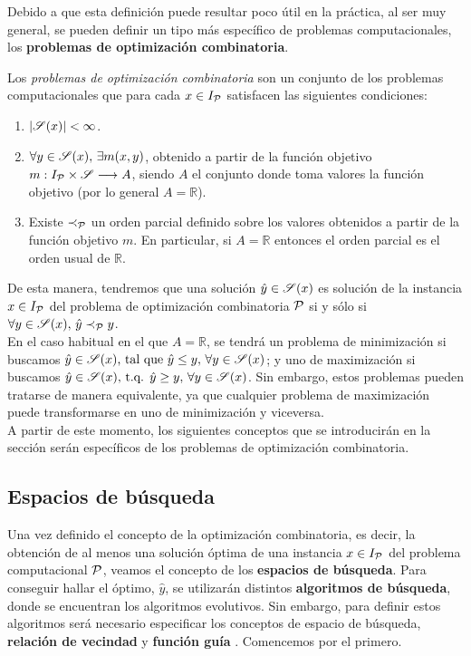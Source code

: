 Debido a que esta definición puede resultar poco útil en la práctica, al ser muy general, se pueden definir un tipo más específico de problemas computacionales, los \textbf{problemas de optimización combinatoria}.

\begin{definition}
    Los \textit{problemas de optimización combinatoria} son un conjunto de los problemas computacionales que para cada $x\in I_{\mathcal{P}}$ satisfacen las siguientes condiciones:
\begin{enumerate}
    \item $|\mathscr{S}(x)|<\infty$.
    \item $\forall y \in \mathscr{S}(x),\, \exists m(x,y)$, obtenido a partir de la función objetivo $m:I_{\mathcal{P}}\times\mathscr{S}\longrightarrow A$, siendo $A$ el conjunto donde toma valores la función objetivo (por lo general $A=\mathbb{R}$).
    \item Existe $\prec_{\mathcal{P}}$ un orden parcial definido sobre los valores obtenidos a partir de la función objetivo $m$. En particular, si $A=\mathbb{R}$ entonces el orden parcial es el orden usual de $\mathbb{R}$.
\end{enumerate}
\end{definition} 

De esta manera, tendremos que una solución $\hat{y}\in\mathscr{S}(x)$ es solución de la instancia $x\in I_{\mathcal{P}}$ del problema de optimización combinatoria $\mathcal{P}$ si y sólo si $\forall y \in \mathscr{S}(x),\, \hat{y}\prec_{\mathcal{P}} y$.\\

En el caso habitual en el que $A=\mathbb{R}$, se tendrá un problema de minimización si buscamos $\hat{y}\in\mathscr{S}(x)\text{, tal que }\hat{y}\leq y, \,\forall y \in \mathscr{S}(x)$; y uno de maximización si buscamos $\hat{y}\in\mathscr{S}(x)\text{, t.q. }\hat{y}\geq y, \,\forall y \in \mathscr{S}(x)$. Sin embargo, estos problemas pueden tratarse de manera equivalente, ya que cualquier problema de maximización puede transformarse en uno de minimización y viceversa.\\

A partir de este momento, los siguientes conceptos que se introducirán en la sección serán específicos de los problemas de optimización combinatoria.

\subsection{Espacios de búsqueda}
Una vez definido el concepto de la optimización combinatoria, es decir, la obtención de al menos una solución óptima de una instancia $x\in I_{\mathcal{P}}$ del problema computacional $\mathcal{P}$, veamos el concepto de los \textbf{espacios de búsqueda}. Para conseguir hallar el óptimo, $\hat{y}$, se utilizarán distintos \textbf{algoritmos de búsqueda}, donde se encuentran los algoritmos evolutivos. Sin embargo, para definir estos algoritmos será necesario especificar los conceptos de espacio de búsqueda, \textbf{relación de vecindad} y \textbf{función guía} \cite{metah-hb}. Comencemos por el primero.

